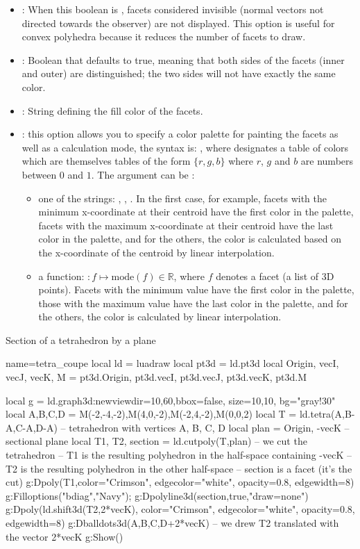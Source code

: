 \begin{itemize}
    \item {}: When this boolean is \true, facets considered invisible (normal vectors not directed towards the observer) are not displayed. This option is useful for convex polyhedra because it reduces the number of facets to draw.
    \item {}: Boolean that defaults to true, meaning that both sides of the facets (inner and outer) are distinguished; the two sides will not have exactly the same color.
    \item {}: String defining the fill color of the facets.
    \item {}:  this option allows you to specify a color palette for painting the facets as well as a calculation mode, the syntax is: , where  designates a table of colors which are themselves tables of the form $\{r,g,b\}$ where $r$, $g$ and $b$ are numbers between $0$ and $1$. The argument   can be :
    \begin{itemize}
        \item one of the strings: , , . In the first case, for example, facets with the minimum x-coordinate at their centroid have the first color in the palette, facets with the maximum x-coordinate at their centroid have the last color in the palette, and for the others, the color is calculated based on the x-coordinate of the centroid by linear interpolation.
        \item a function: $\colon f \mapsto \mathrm{mode}(f)\in\mathbb R$, where $f$ denotes a facet (a list of 3D points). Facets with the minimum value have the first color in the palette, those with the maximum value have the last color in the palette, and for the others, the color is calculated by linear interpolation.
    \end{itemize}
\end{itemize}

\begin{demo}{Section of a tetrahedron by a plane}
\begin{luadraw}{name=tetra_coupe}
local ld = luadraw
local pt3d = ld.pt3d
local Origin, vecI, vecJ, vecK, M = pt3d.Origin, pt3d.vecI, pt3d.vecJ, pt3d.vecK, pt3d.M

local g = ld.graph3d:new{viewdir={10,60},bbox=false, size={10,10}, bg="gray!30"}
local A,B,C,D = M(-2,-4,-2),M(4,0,-2),M(-2,4,-2),M(0,0,2)
local T = ld.tetra(A,B-A,C-A,D-A) -- tetrahedron with vertices A, B, C, D
local plan = {Origin, -vecK} -- sectional plane
local T1, T2, section = ld.cutpoly(T,plan) -- we cut the tetrahedron
-- T1 is the resulting polyhedron in the half-space containing -vecK
-- T2 is the resulting polyhedron in the other half-space
-- section is a facet (it's the cut)
g:Dpoly(T1,{color="Crimson", edgecolor="white", opacity=0.8, edgewidth=8})
g:Filloptions("bdiag","Navy"); g:Dpolyline3d(section,true,"draw=none")
g:Dpoly(ld.shift3d(T2,2*vecK), {color="Crimson", edgecolor="white", opacity=0.8, edgewidth=8})
g:Dballdots3d({A,B,C,D+2*vecK}) -- we drew T2 translated with the vector 2*vecK
g:Show()
\end{luadraw}
\end{demo}

